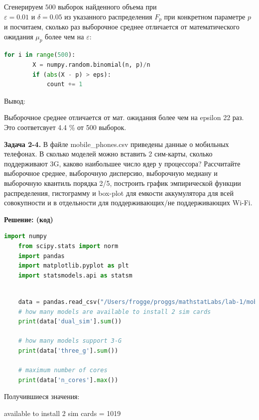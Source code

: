 \documentclass{article}
\begin{document}
Сгенерируем $500$ выборок найденного объема при \\
$\varepsilon=0.01$ и $\delta=0.05$ из указанного распределения $F_p$ при конкретном параметре $p$ и посчитаем, сколько раз выборочное среднее отличается от математического ожидания $\mu_p$ более чем на $\varepsilon$:

\begin{lstlisting}[language=Python, mathescape=true, breaklines=true]
    for i in range(500):
        X = numpy.random.binomial(n, p)/n
        if (abs(X - p) > eps):
            count += 1
\end{lstlisting}
Вывод:

Выборочное среднее отличается от мат. ожидания более чем на epsilon 22 раз.
Это соответсвует 4.4 \% от 500 выборок.

\newpage
\textbf{Задача 2-4.} В файле mobile\_phones.csv приведены данные о мобильных телефонах. В сколько моделей можно вставить 2 сим-карты, сколько поддерживают 3G, каково наибольшее число ядер у процессора? Рассчитайте выборочное среднее, выборочную дисперсию, выборочную медиану и выборочную квантиль порядка 2/5, построить график эмпирической функции распределения, гистограмму и box-plot для емкости аккумулятора для всей совокупности и в отдельности для поддерживающих/не поддерживающих Wi-Fi.
\vspace{5mm}

\textbf{Решение: (код)}

\begin{lstlisting}[caption={Imports},label={lst:label},language=Python, mathescape=true, breaklines=true]
    import numpy
    from scipy.stats import norm
    import pandas
    import matplotlib.pyplot as plt
    import statsmodels.api as statsm
\end{lstlisting}

\begin{lstlisting}[language=Python, mathescape=true, breaklines=true]

    data = pandas.read_csv("/Users/frogge/proggs/mathstatLabs/lab-1/mobile_phones.csv")
    # how many models are available to install 2 sim cards
    print(data['dual_sim'].sum())

    # how many models support 3-G
    print(data['three_g'].sum())

    # maximum number of cores
    print(data['n_cores'].max())
\end{lstlisting}
Получившиеся значения:

available to install 2 sim cards = 1019
\end{document}
